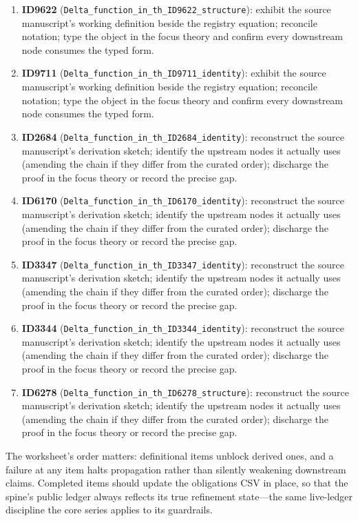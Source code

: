 \documentclass[11pt]{article}
\theoremstyle{remark}
\begin{document}
\begin{enumerate}
\item \textbf{ID9622} (\texttt{Delta\_function\_in\_th\_ID9622\_structure}): exhibit the source manuscript's working definition beside the registry equation; reconcile notation; type the object in the focus theory and confirm every downstream node consumes the typed form.
\item \textbf{ID9711} (\texttt{Delta\_function\_in\_th\_ID9711\_identity}): exhibit the source manuscript's working definition beside the registry equation; reconcile notation; type the object in the focus theory and confirm every downstream node consumes the typed form.
\item \textbf{ID2684} (\texttt{Delta\_function\_in\_th\_ID2684\_identity}): reconstruct the source manuscript's derivation sketch; identify the upstream nodes it actually uses (amending the chain if they differ from the curated order); discharge the proof in the focus theory or record the precise gap.
\item \textbf{ID6170} (\texttt{Delta\_function\_in\_th\_ID6170\_identity}): reconstruct the source manuscript's derivation sketch; identify the upstream nodes it actually uses (amending the chain if they differ from the curated order); discharge the proof in the focus theory or record the precise gap.
\item \textbf{ID3347} (\texttt{Delta\_function\_in\_th\_ID3347\_identity}): reconstruct the source manuscript's derivation sketch; identify the upstream nodes it actually uses (amending the chain if they differ from the curated order); discharge the proof in the focus theory or record the precise gap.
\item \textbf{ID3344} (\texttt{Delta\_function\_in\_th\_ID3344\_identity}): reconstruct the source manuscript's derivation sketch; identify the upstream nodes it actually uses (amending the chain if they differ from the curated order); discharge the proof in the focus theory or record the precise gap.
\item \textbf{ID6278} (\texttt{Delta\_function\_in\_th\_ID6278\_structure}): reconstruct the source manuscript's derivation sketch; identify the upstream nodes it actually uses (amending the chain if they differ from the curated order); discharge the proof in the focus theory or record the precise gap.
\end{enumerate}

The worksheet's order matters: definitional items unblock derived ones, and a failure at any item halts propagation rather than silently weakening downstream claims. Completed items should update the obligations CSV in place, so that the spine's public ledger always reflects its true refinement state---the same live-ledger discipline the core series applies to its guardrails.
\end{document}
